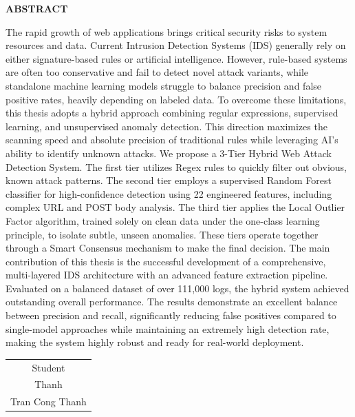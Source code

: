 \documentclass[../main.tex]{subfiles}
\begin{document}
\begin{center}
    \Large{\textbf{ABSTRACT}}\\
\end{center}
\vspace{1cm}
The rapid growth of web applications brings critical security risks to system resources and data. Current Intrusion Detection Systems (IDS) generally rely on either signature-based rules or artificial intelligence. However, rule-based systems are often too conservative and fail to detect novel attack variants, while standalone machine learning models struggle to balance precision and false positive rates, heavily depending on labeled data. To overcome these limitations, this thesis adopts a hybrid approach combining regular expressions, supervised learning, and unsupervised anomaly detection. This direction maximizes the scanning speed and absolute precision of traditional rules while leveraging AI's ability to identify unknown attacks. We propose a 3-Tier Hybrid Web Attack Detection System. The first tier utilizes Regex rules to quickly filter out obvious, known attack patterns. The second tier employs a supervised Random Forest classifier for high-confidence detection using 22 engineered features, including complex URL and POST body analysis. The third tier applies the Local Outlier Factor algorithm, trained solely on clean data under the one-class learning principle, to isolate subtle, unseen anomalies. These tiers operate together through a Smart Consensus mechanism to make the final decision. The main contribution of this thesis is the successful development of a comprehensive, multi-layered IDS architecture with an advanced feature extraction pipeline. Evaluated on a balanced dataset of over 111,000 logs, the hybrid system achieved outstanding overall performance. The results demonstrate an excellent balance between precision and recall, significantly reducing false positives compared to single-model approaches while maintaining an extremely high detection rate, making the system highly robust and ready for real-world deployment.
\begin{flushright}
\begin{tabular}{@{}c@{}}
Student\\
Thanh\\
Tran Cong Thanh\\
\end{tabular}
\end{flushright}
\end{document}
